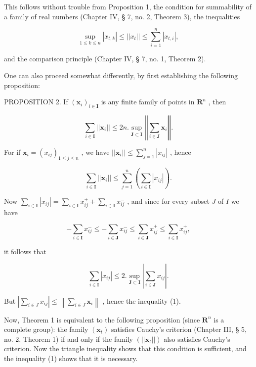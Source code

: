 This follows without trouble from Proposition 1, the condition for summability of a family of real numbers (Chapter IV, § 7, no. 2, Theorem 3), the inequalities

\[
\sup _ {1 \leqslant k \leqslant n} | x _ {t, k} | \leqslant | | x _ {t} | | \leqslant \sum_ {i = 1} ^ {n} | x _ {t, i} |,
\]

and the comparison principle (Chapter IV, § 7, no. 1, Theorem 2).

One can also proceed somewhat differently, by first establishing the following proposition:

PROPOSITION 2. If \((\pmb{x}_i)_{i\in \mathbf{I}}\) is any finite family of points in \(\mathbf{R}^n\) , then

\[
\sum_ {i \in \mathbf {I}} | | \boldsymbol {x} _ {i} | | \leqslant 2 n. \sup _ {\mathbf {J} \subset \mathbf {I}} \left| \left| \sum_ {i \in \mathbf {J}} \boldsymbol {x} _ {i} \right| \right|.\tag{1}
\]

For if \(\pmb{x}_i = (x_{ij})_{1\leqslant j\leqslant n}\) , we have \(||\pmb{x}_i|| \leqslant \sum_{j=1}^{n} |x_{ij}|\) , hence

\[
\sum_ {i \in \mathbf {I}} | | \boldsymbol {x} _ {i} | | \leqslant \sum_ {j = 1} ^ {n} \left(\sum_ {i \in \mathbf {I}} | x _ {i j} |\right).
\]

Now \(\sum_{i\in \mathbf{I}}|x_{ij}| = \sum_{i\in \mathbf{I}}x_{ij}^{+} + \sum_{i\in \mathbf{I}}x_{ij}^{-}\) , and since for every subset \(J\) of \(I\) we have

\[
- \sum_ {i \in \mathbf {I}} x _ {i j} ^ {-} \leqslant - \sum_ {i \in \mathbf {J}} x _ {i j} ^ {-} \leqslant \sum_ {i \in \mathbf {J}} x _ {i j} ^ {+} \leqslant \sum_ {i \in \mathbf {I}} x _ {i j} ^ {+},
\]

it follows that

\[
\sum_ {i \in \mathbf {I}} | x _ {i j} | \leqslant 2. \sup _ {\mathbf {J} \subset \mathbf {I}} \left| \sum_ {i \in \mathbf {J}} x _ {i j} \right|.
\]

But \(\left|\sum_{i\in J}x_{ij}\right| \leqslant \left\| \sum_{i\in J}\boldsymbol{x}_i\right\|\) , hence the inequality (1).

Now, Theorem 1 is equivalent to the following proposition (since \(\mathbf{R}^n\) is a complete group): the family \((\pmb{x}_t)\) satisfies Cauchy's criterion (Chapter III, § 5, no. 2, Theorem 1) if and only if the family \((||\pmb{x}_t||)\) also satisfies Cauchy's criterion. Now the triangle inequality shows that this condition is sufficient, and the inequality (1) shows that it is necessary.

